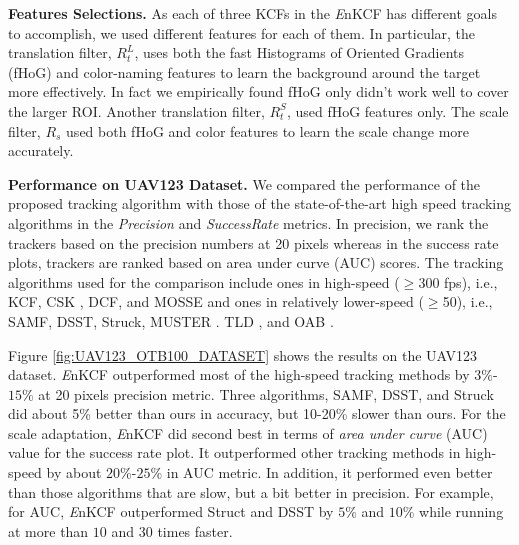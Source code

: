 \documentclass{bmvc2k}
\begin{document}
\textbf{Features Selections.} As each of three KCFs in the {\it E}nKCF
has different goals to accomplish, we used different features for each
of them. In particular, the translation filter, $R_{t}^{L}$, uses both
the fast Histograms of Oriented Gradients
(fHoG)\cite{felzenszwalb2010object} and
color-naming\cite{van2009learning} features to learn the background
around the target more effectively. In fact we empirically found fHoG
only didn't work well to cover the larger ROI. Another translation
filter, $R_{t}^{S}$, used fHoG features only. The scale filter,
$R_{s}$ used both fHoG and color features to learn the scale change
more accurately.

\textbf{Performance on UAV123 Dataset.}  We compared the performance
of the proposed tracking algorithm with those of the state-of-the-art
high speed tracking algorithms in the \textit{Precision} and
\textit{Success\:Rate} metrics. In precision, we rank the trackers
based on the precision numbers at 20 pixels whereas in the success
rate plots, trackers are ranked based on area under curve (AUC)
scores. The tracking algorithms used for the comparison include ones
in high-speed ($\geq$300 fps), i.e., KCF\cite{henriques2015high}, CSK
\cite{henriques2012exploiting}, DCF\cite{henriques2015high}, and
MOSSE\cite{bolme2010visual,henriques2015high} and ones in relatively
lower-speed ($\geq$50), i.e., SAMF\cite{li2014scale},
DSST\cite{danelljan2014accurate}, Struck\cite{hare2012efficient},
MUSTER \cite{hong2015multi}. TLD \cite{kalal2012tracking}, and OAB
\cite{zhang2012robust}. 

Figure \ref{fig:UAV123_OTB100_DATASET} shows the results on the UAV123
dataset. {\it E}nKCF outperformed most of the high-speed tracking
methods by $3\%$-$15\%$ at 20 pixels precision metric. Three
algorithms, SAMF, DSST, and Struck did about 5\% better than ours in
accuracy, but 10-20\% slower than ours. For the scale adaptation, {\it
  E}nKCF did second best in terms of \textit{area under curve} (AUC)
value for the success rate plot. It outperformed other tracking
methods in high-speed by about $20\%$-$25\%$ in AUC metric. In
addition, it performed even better than those algorithms that are
slow, but a bit better in precision. For example, for AUC, {\it E}nKCF
outperformed Struct and DSST by $5\%$ and $10\%$ while running at more
than $10$ and $30$ times faster.
\end{document}
